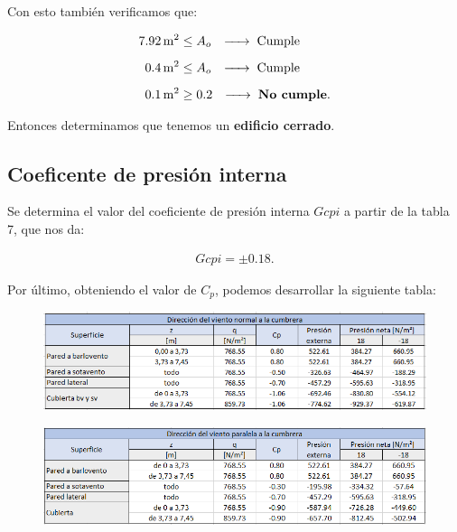 \documentclass[../main.tex]{subfiles}
\begin{document}
Con esto también verificamos que:

\begin{align*}
  \SI{7.92}{m^2} &\leq  A_o \hspace{0.25cm} \xrightarrow{\hspace*{0.5cm}} \hspace{0.1cm} \text{Cumple}\\[5pt] 
  \SI{0.4}{m^2} &\leq A_o \hspace{0.25cm} \xrightarrow{\hspace*{0.5cm}} \hspace{0.1cm} \text{Cumple} \\[5pt] 
  \SI{0.1}{m^2} &\geq 0.2 \hspace{0.25cm} \xrightarrow{\hspace*{0.5cm}} \hspace{0.1cm} \text{\textbf{No cumple}} 
.\end{align*}

Entonces determinamos que tenemos un \textbf{edificio cerrado}.

\subsection{Coeficente de presión interna}

Se determina el valor del coeficiente de presión interna $Gcpi$ a partir de la 
tabla 7, que nos da:

\begin{align*}
  Gcpi = \pm 0.18
.\end{align*}

Por último, obteniendo el valor de $C_p$, podemos desarrollar la siguiente
tabla:

\begin{figure}[ht]
  \centering
  \includegraphics[width=1\textwidth]{../images/normal_cumbrera}
  \label{fig:normal_cumbrera}
\end{figure}

\begin{figure}[ht]
  \centering
  \includegraphics[width=1\textwidth]{../images/paralelo_cumbrera}
\end{figure}
\end{document}
